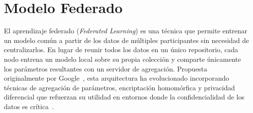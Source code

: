 






\section{Modelo Federado}
 
El aprendizaje federado (\textit{Federated Learning}) es una técnica que permite entrenar
un modelo común a partir de los datos de múltiples participantes sin necesidad de
centralizarlos. En lugar de reunir todos los datos en un único repositorio, cada nodo
entrena un modelo local sobre su propia colección y comparte únicamente los parámetros
resultantes con un servidor de agregación. Propuesta originalmente por
Google~\citep{mcmahan2017communication}, esta arquitectura ha evolucionado incorporando
técnicas de agregación de parámetros, encriptación homomórfica y privacidad diferencial que
refuerzan su utilidad en entornos donde la confidencialidad de los datos es
crítica~\citep{bonawitz2016practicalsecureaggregationfederated}.

